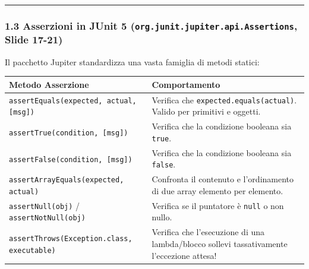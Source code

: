 \documentclass[11pt,a4paper]{article}
\newcommand{\passthrough}[1]{#1}
\begin{document}
\begin{center}\rule{0.5\linewidth}{0.5pt}\end{center}

\subsubsection{\texorpdfstring{1.3 Asserzioni in JUnit 5
(\texttt{org.junit.jupiter.api.Assertions}, Slide
17-21)}{1.3 Asserzioni in JUnit 5 (org.junit.jupiter.api.Assertions, Slide 17-21)}}\label{asserzioni-in-junit-5-org.junit.jupiter.api.assertions-slide-17-21}

Il pacchetto Jupiter standardizza una vasta famiglia di metodi statici:

\begin{longtable}[]{@{}
  >{\raggedright\arraybackslash}p{}
  >{\raggedright\arraybackslash}p{}@{}}
\toprule\noalign{}
\begin{minipage}[b]{\linewidth}\raggedright
Metodo Asserzione
\end{minipage} & \begin{minipage}[b]{\linewidth}\raggedright
Comportamento
\end{minipage} \\
\midrule\noalign{}
\endhead
\bottomrule\noalign{}
\endlastfoot
\passthrough{\lstinline!assertEquals(expected, actual, [msg])!} &
Verifica che \passthrough{\lstinline!expected.equals(actual)!}. Valido
per primitivi e oggetti. \\
\passthrough{\lstinline!assertTrue(condition, [msg])!} & Verifica che la
condizione booleana sia \passthrough{\lstinline!true!}. \\
\passthrough{\lstinline!assertFalse(condition, [msg])!} & Verifica che
la condizione booleana sia \passthrough{\lstinline!false!}. \\
\passthrough{\lstinline!assertArrayEquals(expected, actual)!} &
Confronta il contenuto e l'ordinamento di due array elemento per
elemento. \\
\passthrough{\lstinline!assertNull(obj)!} /
\passthrough{\lstinline!assertNotNull(obj)!} & Verifica se il puntatore
è \passthrough{\lstinline!null!} o non nullo. \\
\passthrough{\lstinline!assertThrows(Exception.class, executable)!} &
Verifica che l'esecuzione di una lambda/blocco sollevi tassativamente
l'eccezione attesa! \\
\end{longtable}
\end{document}
